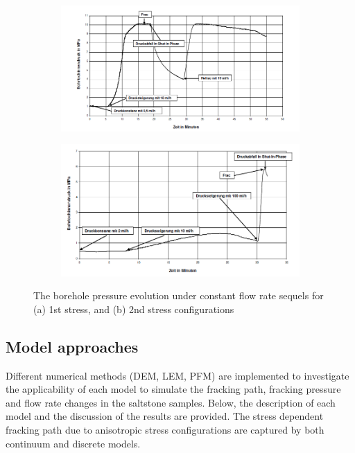 \begin{figure}[!ht]
\begin{subfigure}[c]{0.48\textwidth}
\includegraphics[width=1\textwidth]{figures/Amir_ME2_Pressure_Time_1.png}
\subcaption{}
\label{fig:Amir_ME2_Pressure_Time_a}
\end{subfigure}
\hfill
\begin{subfigure}[c]{0.48\textwidth}
\includegraphics[width=1\textwidth]{figures/Amir_ME2_Pressure_Time_2.png}
\subcaption{}
\label{fig:Amir_ME2_Pressure_Time_b}
\end{subfigure}
\caption{The borehole pressure evolution under constant flow rate sequels for (a) 1st stress, and (b) 2nd stress configurations \cite{Kamlot2009}}
\end{figure}
\subsection{Model approaches}
Different numerical methods (DEM, LEM, PFM) are implemented to investigate the applicability of each model to simulate the fracking path, fracking pressure and flow rate changes in the saltstone samples. Below, the description of each model and the discussion of the results are provided. The stress dependent fracking path due to anisotropic stress configurations are captured by both continuum and discrete models. 
